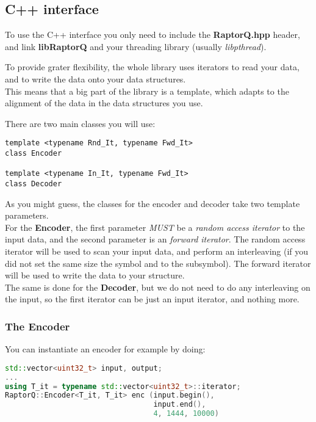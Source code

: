 \documentclass[11pt,a4paper]{refart}
\begin{document}
\subsection{C++ interface}
To use the C++ interface you only need to include the \textbf{RaptorQ.hpp} header, and link \textbf{libRaptorQ} and your threading library (usually
\textit{libpthread}).

To provide grater flexibility, the whole library uses iterators to read your data, and to write the data onto your data structures.\\
This means that a big part of the library is a template, which adapts to the alignment of the data in the data structures you use.

There are two main classes you will use:
\begin{verbatim}
template <typename Rnd_It, typename Fwd_It>
class Encoder

template <typename In_It, typename Fwd_It>
class Decoder
\end{verbatim}

As you might guess, the classes for the encoder and decoder take two template parameters.\\
For the \textbf{Encoder}, the first parameter \textit{MUST} be a \textit{random access iterator} to the input data, and the second parameter is an
\textit{forward iterator}. The random access iterator will be used to scan your input data, and perform an interleaving (if you did not set the same size the
symbol and to the subsymbol). The forward iterator will be used to write the data to your structure.\\
The same is done for the \textbf{Decoder}, but we do not need to do any interleaving on the input, so the first iterator can be just an input iterator,
and nothing more.


\subsubsection{The Encoder}
You can instantiate an encoder for example by doing:

\begin{lstlisting}[language=C++]
std::vector<uint32_t> input, output;
...
using T_it = typename std::vector<uint32_t>::iterator;
RaptorQ::Encoder<T_it, T_it> enc (input.begin(),
                                  input.end(),
                                  4, 1444, 10000)
\end{lstlisting}
\end{document}
